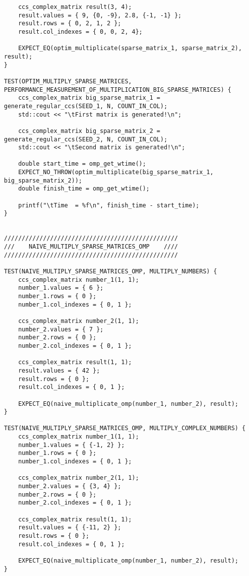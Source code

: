 \documentclass{report}
\begin{document}
\begin{itemize}
\begin{itemize}
\begin{lstlisting}
    ccs_complex_matrix result(3, 4);
    result.values = { 9, {0, -9}, 2.8, {-1, -1} };
    result.rows = { 0, 2, 1, 2 };
    result.col_indexes = { 0, 0, 2, 4};
    
    EXPECT_EQ(optim_multiplicate(sparse_matrix_1, sparse_matrix_2), result);
}

TEST(OPTIM_MULTIPLY_SPARSE_MATRICES, PERFORMANCE_MEASUREMENT_OF_MULTIPLICATION_BIG_SPARSE_MATRICES) {
    ccs_complex_matrix big_sparse_matrix_1 = generate_regular_ccs(SEED_1, N, COUNT_IN_COL);
    std::cout << "\tFirst matrix is generated!\n";

    ccs_complex_matrix big_sparse_matrix_2 = generate_regular_ccs(SEED_2, N, COUNT_IN_COL);
    std::cout << "\tSecond matrix is generated!\n";

    double start_time = omp_get_wtime();
    EXPECT_NO_THROW(optim_multiplicate(big_sparse_matrix_1, big_sparse_matrix_2));
    double finish_time = omp_get_wtime();

    printf("\tTime  = %f\n", finish_time - start_time);
}


/////////////////////////////////////////////////
///    NAIVE_MULTIPLY_SPARSE_MATRICES_OMP    ////
/////////////////////////////////////////////////

TEST(NAIVE_MULTIPLY_SPARSE_MATRICES_OMP, MULTIPLY_NUMBERS) {
    ccs_complex_matrix number_1(1, 1);
    number_1.values = { 6 };
    number_1.rows = { 0 };
    number_1.col_indexes = { 0, 1 };

    ccs_complex_matrix number_2(1, 1);
    number_2.values = { 7 };
    number_2.rows = { 0 };
    number_2.col_indexes = { 0, 1 };

    ccs_complex_matrix result(1, 1);
    result.values = { 42 };
    result.rows = { 0 };
    result.col_indexes = { 0, 1 };

    EXPECT_EQ(naive_multiplicate_omp(number_1, number_2), result);
}

TEST(NAIVE_MULTIPLY_SPARSE_MATRICES_OMP, MULTIPLY_COMPLEX_NUMBERS) {
    ccs_complex_matrix number_1(1, 1);
    number_1.values = { {-1, 2} };
    number_1.rows = { 0 };
    number_1.col_indexes = { 0, 1 };

    ccs_complex_matrix number_2(1, 1);
    number_2.values = { {3, 4} };
    number_2.rows = { 0 };
    number_2.col_indexes = { 0, 1 };

    ccs_complex_matrix result(1, 1);
    result.values = { {-11, 2} };
    result.rows = { 0 };
    result.col_indexes = { 0, 1 };

    EXPECT_EQ(naive_multiplicate_omp(number_1, number_2), result);
}


\end{lstlisting}
\end{itemize}
\end{itemize}
\end{document}
